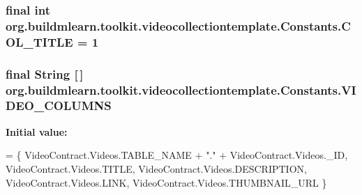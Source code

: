 \subsubsection[{\texorpdfstring{C\+O\+L\+\_\+\+T\+I\+T\+LE}{COL_TITLE}}]{\setlength{\rightskip}{0pt plus 5cm}final int org.\+buildmlearn.\+toolkit.\+videocollectiontemplate.\+Constants.\+C\+O\+L\+\_\+\+T\+I\+T\+LE = 1\hspace{0.3cm}{\ttfamily [static]}}\hypertarget{classorg_1_1buildmlearn_1_1toolkit_1_1videocollectiontemplate_1_1Constants_a1ce807b88fd23ea492c6d8474f7a628c}{}\label{classorg_1_1buildmlearn_1_1toolkit_1_1videocollectiontemplate_1_1Constants_a1ce807b88fd23ea492c6d8474f7a628c}
\subsubsection[{\texorpdfstring{V\+I\+D\+E\+O\+\_\+\+C\+O\+L\+U\+M\+NS}{VIDEO_COLUMNS}}]{\setlength{\rightskip}{0pt plus 5cm}final String \mbox{[}$\,$\mbox{]} org.\+buildmlearn.\+toolkit.\+videocollectiontemplate.\+Constants.\+V\+I\+D\+E\+O\+\_\+\+C\+O\+L\+U\+M\+NS\hspace{0.3cm}{\ttfamily [static]}}\hypertarget{classorg_1_1buildmlearn_1_1toolkit_1_1videocollectiontemplate_1_1Constants_a8b67a158639433cf19c0cfb64e6d0604}{}\label{classorg_1_1buildmlearn_1_1toolkit_1_1videocollectiontemplate_1_1Constants_a8b67a158639433cf19c0cfb64e6d0604}
{\bfseries Initial value\+:}
\begin{DoxyCode}
= \{
            VideoContract.Videos.TABLE\_NAME + \textcolor{stringliteral}{"."} + VideoContract.Videos.\_ID,
            VideoContract.Videos.TITLE,
            VideoContract.Videos.DESCRIPTION,
            VideoContract.Videos.LINK,
            VideoContract.Videos.THUMBNAIL\_URL
    \}
\end{DoxyCode}
